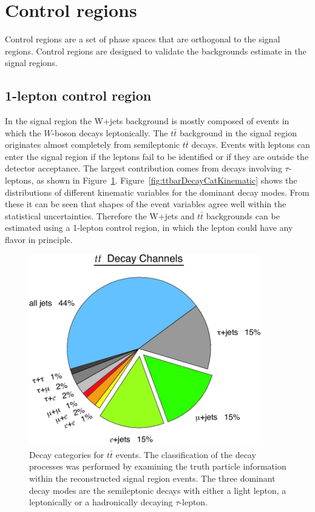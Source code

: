 \section{Control regions}
\label{sec:ana-sig:ctlreg}
\par Control regions are a set of phase spaces that are orthogonal to the signal regions. 
Control regions are designed to validate the backgrounds estimate in the signal regions.

\subsection{1-lepton control region}
\par In the signal region the W+jets background is mostly composed of events in which the $W$-boson decays leptonically. 
The $t\bar{t}$ background in the signal region originates almost completely from semileptonic $t\bar{t}$ decays. 
Events with leptons can enter the signal region if the leptons fail to be identified or if they are outside the detector acceptance. 
The largest contribution comes from decays involving $\tau$-leptons, as shown in Figure~\ref{fig:ttbarDecayCat}. 
Figure~\ref{fig:ttbarDecayCatKinematic} shows the distributions of different kinematic variables for the dominant decay modes. 
From these it can be seen that shapes of the event variables agree well within the statistical uncertainties. 
Therefore the W+jets and $t\bar{t}$ backgrounds can be estimated using a 1-lepton control region, in which the lepton could have any flavor in principle.

\begin{figure}[h]
    \centering
    \includegraphics[width=0.9\textwidth]{chapters/c7/figures/ttbar-decay-modes.png}
    \caption{Decay categories for $t\bar{t}$ events. The classification of the decay processes was performed by examining the truth particle information within the reconstructed signal region events. The three dominant decay modes are the semileptonic decays with either a light lepton, a leptonically or a hadronically decaying $\tau$-lepton.}
    \label{fig:ttbarDecayCat}
\end{figure}

